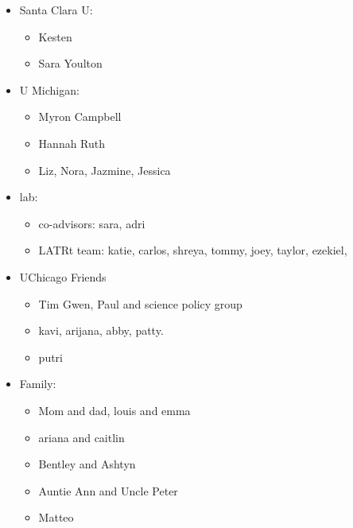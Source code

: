 \documentclass{ucetd}
\begin{document}
\begin{itemize}

    \item Santa Clara U: \begin{itemize}
 
        \item Kesten

        \item Sara Youlton
    \end{itemize}
    \item U Michigan: \begin{itemize}
        \item Myron Campbell
        \item Hannah Ruth
        \item Liz, Nora, Jazmine, Jessica
    \end{itemize}
    \item lab: \begin{itemize}
        \item co-advisors: sara, adri
        \item LATRt team: katie, carlos, shreya, tommy, joey, taylor, ezekiel, 
    \end{itemize}
    \item UChicago Friends \begin{itemize}
        \item Tim Gwen, Paul and science policy group
        \item kavi, arijana, abby, patty.
        \item putri
    \end{itemize}
    \item Family: \begin{itemize}
        \item Mom and dad, louis and emma
        \item ariana and caitlin
        \item Bentley and Ashtyn
        \item Auntie Ann and Uncle Peter
        \item Matteo
    \end{itemize}

\end{itemize}
\end{document}
